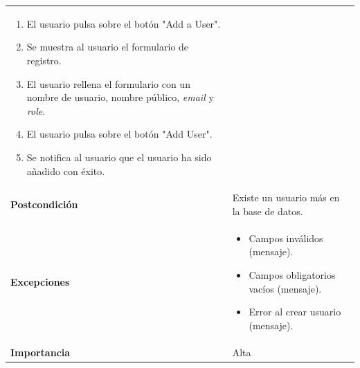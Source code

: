 \documentclass[
]{article}
\providecommand{\tightlist}{%
  \setlength{\itemsep}{0pt}\setlength{\parskip}{0pt}}
\begin{document}
\begin{longtable}[]{@{}ll@{}}
\begin{minipage}[t]{0.74\columnwidth}
\begin{enumerate}
\tightlist
\item
  El usuario pulsa sobre el botón "Add a User".
\item
  Se muestra al usuario el formulario de registro.
\item
  El usuario rellena el formulario con un nombre de usuario, nombre
  público, \emph{email} y \emph{role}.
\item
  El usuario pulsa sobre el botón "Add User".
\item
  Se notifica al usuario que el usuario ha sido añadido con éxito.
\end{enumerate}\strut
\end{minipage}\tabularnewline
\begin{minipage}[t]{0.20\columnwidth}\raggedright
\textbf{Postcondición}\strut
\end{minipage} & \begin{minipage}[t]{0.74\columnwidth}\raggedright
Existe un usuario más en la base de datos.\strut
\end{minipage}\tabularnewline
\begin{minipage}[t]{0.20\columnwidth}\raggedright
\textbf{Excepciones}\strut
\end{minipage} & \begin{minipage}[t]{0.74\columnwidth}\raggedright
\begin{itemize}
\tightlist
\item
  Campos inválidos (mensaje).
\item
  Campos obligatorios vacíos (mensaje).
\item
  Error al crear usuario (mensaje).
\end{itemize}\strut
\end{minipage}\tabularnewline
\begin{minipage}[t]{0.20\columnwidth}\raggedright
\textbf{Importancia}\strut
\end{minipage} & \begin{minipage}[t]{0.74\columnwidth}\raggedright
Alta\strut
\end{minipage}\tabularnewline
\bottomrule
\end{longtable}
\end{document}
